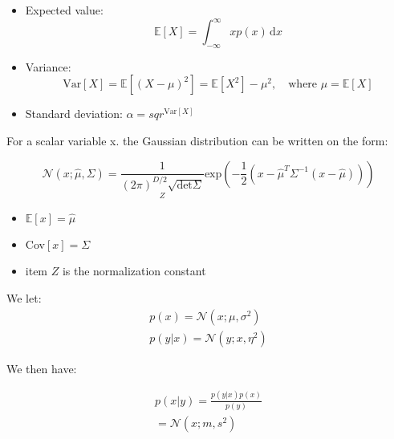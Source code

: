     \begin{itemize}
        \item Expected value: \\
        \begin{equation}
            \mathbb{E}[X] = \int_{-\infty}^{\infty} xp(x)\,\text{d}x
        \end{equation}
        \item Variance: \\
        \begin{equation}
            \text{Var}[X] = \mathbb{E}[(X-\mu)^{2}]= \mathbb{E}[X^{2}] - \mu^{2}, \quad \text{where } \mu = \mathbb{E}[X] 
        \end{equation}
        \item Standard deviation: $\alpha = sqr^{\text{Var}[X]}$
    \end{itemize}

    For a scalar variable x. the Gaussian distribution can be written on the form:

    \begin{equation}
        \mathcal{N}(x; \hat{\mu}, \Sigma) =  \underset{Z}{\frac{1} {(2\pi)^{D/2} \sqrt{{\text{det}\Sigma}}}} \text{exp} \left( -\frac{1} {2} (x- \hat{\mu}^{T} \Sigma^{-1}(x-\hat{\mu}))  \right) 
    \end{equation}
    
    \begin{itemize}
        \item $\mathbb{E}[x] = \hat{\mu} $
        \item Cov$[x] = \Sigma$
        \item item $Z$ is the normalization constant
    \end{itemize}
    
    We let:
    \begin{equation}
    \begin{aligned}
        p(x) = \mathcal{N} (x; \mu, \sigma^{2}) \\
        p(y | x) = \mathcal{N} (y;x, \eta^{2})
    \end{aligned}
    \end{equation}

    We then have:

    \begin{equation}
    \begin{aligned}
        p(x|y) = \frac{p(y|x)p(x)} {p(y)} \\
        = \mathcal{N}(x; m, s^{2}) 
    \end{aligned}
    \end{equation}

